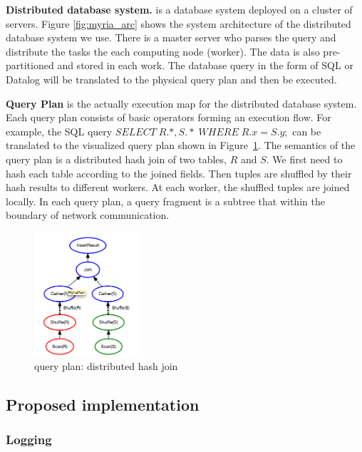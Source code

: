 \documentclass[11pt]{article}
\begin{document}
\noindent\textbf{Distributed database system.} is a database system deployed on a cluster of servers.  Figure \ref{fig:myria_arc} shows the system architecture of the distributed database system we use. There is a master server who parses the query and distribute the tasks the each computing node (worker). The data is also pre-partitioned and stored in each work.  The database query in the form of SQL or Datalog will be translated to the physical query plan and then be executed.

\noindent\textbf{Query Plan} is the actually execution map for the distributed database system.  Each query plan consists of basic operators forming an execution flow. For example, the SQL query $SELECT \; R.*, S.*  \; WHERE \; R.x=S.y ;$ can be translated to the visualized query plan shown in Figure~\ref{fig:query_plan}. The semantics of the query plan is a distributed hash join of two tables, $R$ and $S$. We first need to hash each table according to the joined fields. Then tuples are shuffled by their hash results to different workers. At each worker, the shuffled tuples are joined locally. In each query plan, a query fragment is a subtree that within the boundary of network communication.


\begin{figure}
 \begin{center}
     \includegraphics[width=0.35\textwidth]{partition_join.png}
   \end{center}
  \caption{query plan: distributed hash join}
  \label{fig:query_plan}
\end{figure}



\subsection{Proposed implementation}
	\subsubsection{Logging}
\end{document}
